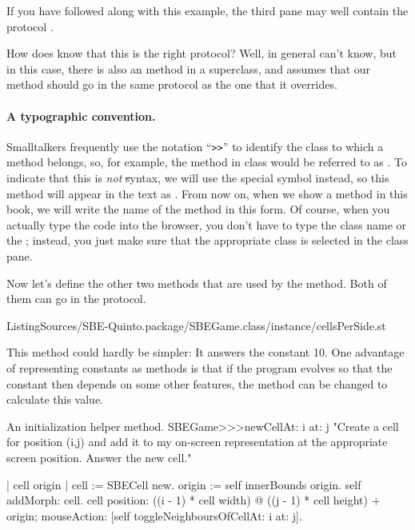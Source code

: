 \documentclass[a4paper,10pt,twoside]{book}
\begin{document}
If you have followed along with this example, the third pane may well contain the protocol .

How does \squeak{} know that this is the right protocol?
Well, in general \squeak{} can't know, but in this case, there is also an  method in a superclass, and \squeak assumes that our  method should go in the same protocol as the one that it overrides.

\paragraph{A typographic convention.}
Smalltalkers frequently use the notation ``\verb|>>|'' to identify the class to which a method belongs, so, for example, the  method in class  would be referred to as .
To indicate that this is \emph{not} \st syntax, we will use the special symbol \ct{>>>} instead, so this method will appear in the text as .
From now on, when we show a method in this book, we will write the name of the method in this form.
Of course, when you actually type the code into the browser, you don't have to type the class name or the \ct{>>>}; instead, you just make sure that the appropriate class is selected in the class pane.

Now let's define the other two methods that are used by the  method.
Both of them can go in the  protocol.

%
{ListingSources/SBE-Quinto.package/SBEGame.class/instance/cellsPerSide.st}

This method could hardly be simpler:
It answers the constant 10.
One advantage of representing constants as methods is that if the program evolves so that the constant then depends on some other features, the method can be changed to calculate this value.

\begin{method}[newCellAt:at:]{An initialization helper method.}
SBEGame>>>newCellAt: i at: j
	"Create a cell for position (i,j) and add it to my on-screen
	representation at the appropriate screen position. Answer the new cell."

	| cell origin |
	cell := SBECell new.
	origin := self innerBounds origin.
	self addMorph: cell.
	cell
		position: ((i - 1) * cell width) @ ((j - 1) * cell height) + origin;
		mouseAction: [self toggleNeighboursOfCellAt: i at: j].
\end{method}
\end{document}
